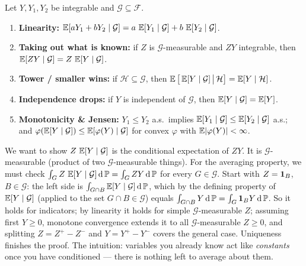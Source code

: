 \begin{proposition}
\label{ch38:prop-core}
Let $Y, Y_1, Y_2$ be integrable and $\mathcal{G} \subseteq \mathcal{F}$.
\begin{enumerate}
  \item \textbf{Linearity:} $\operatorname{\mathbb{E}}[aY_1 + bY_2 \mid \mathcal{G}] = a\,\operatorname{\mathbb{E}}[Y_1\mid\mathcal{G}] +
    b\,\operatorname{\mathbb{E}}[Y_2\mid\mathcal{G}]$.
  \item \textbf{Taking out what is known:} if $Z$ is $\mathcal{G}$-measurable and $ZY$ integrable,
    then $\operatorname{\mathbb{E}}[ZY \mid \mathcal{G}] = Z\,\operatorname{\mathbb{E}}[Y\mid\mathcal{G}]$.
  \item \textbf{Tower / smaller wins:} if $\mathcal{H} \subseteq \mathcal{G}$, then
    $\operatorname{\mathbb{E}}\big[\operatorname{\mathbb{E}}[Y\mid\mathcal{G}] \,\big|\, \mathcal{H}\big] = \operatorname{\mathbb{E}}[Y \mid \mathcal{H}]$.
  \item \textbf{Independence drops:} if $Y$ is independent of $\mathcal{G}$, then
    $\operatorname{\mathbb{E}}[Y\mid\mathcal{G}] = \operatorname{\mathbb{E}}[Y]$.
  \item \textbf{Monotonicity \& Jensen:} $Y_1 \le Y_2$ a.s.\ implies $\operatorname{\mathbb{E}}[Y_1\mid\mathcal{G}] \le
    \operatorname{\mathbb{E}}[Y_2\mid\mathcal{G}]$ a.s.; and $\varphi(\operatorname{\mathbb{E}}[Y\mid\mathcal{G}]) \le \operatorname{\mathbb{E}}[\varphi(Y)\mid
    \mathcal{G}]$ for convex $\varphi$ with $\operatorname{\mathbb{E}}\lvert\varphi(Y)\rvert < \infty$.
\end{enumerate}
\end{proposition}

\begin{whybox}
We want to show $Z\,\operatorname{\mathbb{E}}[Y\mid\mathcal{G}]$ is the conditional expectation of $ZY$. It is
$\mathcal{G}$-measurable (product of two $\mathcal{G}$-measurable things). For the averaging property,
we must check $\int_G Z\,\operatorname{\mathbb{E}}[Y\mid\mathcal{G}]\,\mathrm{d}\operatorname{\mathbb{P}} = \int_G ZY\,\mathrm{d}\operatorname{\mathbb{P}}$ for every $G \in
\mathcal{G}$. Start with $Z = \mathbf{1}_B$, $B \in \mathcal{G}$: the left side is $\int_{G\cap B}
\operatorname{\mathbb{E}}[Y\mid\mathcal{G}]\,\mathrm{d}\operatorname{\mathbb{P}}$, which by the defining property of $\operatorname{\mathbb{E}}[Y\mid\mathcal{G}]$ (applied to
the set $G \cap B \in \mathcal{G}$) equals $\int_{G\cap B} Y\,\mathrm{d}\operatorname{\mathbb{P}} = \int_G \mathbf{1}_B Y\,\mathrm{d}\operatorname{\mathbb{P}}$. So it
holds for indicators; by linearity it holds for simple $\mathcal{G}$-measurable $Z$; assuming first
$Y \ge 0$, monotone convergence extends it to all $\mathcal{G}$-measurable $Z \ge 0$, and splitting
$Z = Z^+ - Z^-$ and $Y = Y^+ - Y^-$ covers the general case.
Uniqueness finishes the proof. The intuition: variables you already know act like \emph{constants}
once you have conditioned --- there is nothing left to average about them.
\end{whybox}

